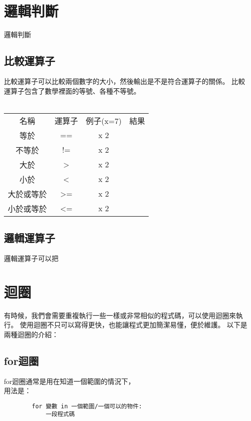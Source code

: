 \documentclass{article}
\begin{document}
\begin{large}
\section{邏輯判斷}

    邏輯判斷

    \subsection{比較運算子}

    比較運算子可以比較兩個數字的大小，然後輸出是不是符合運算子的關係。
    比較運算子包含了數學裡面的等號、各種不等號。\\
    \\
    \begin{tabular}{ |c|c|c|c| } 
        \hline
        名稱 & 運算子 & 例子(x=7) & 結果 \\
        等於 & == & x  2 &  \\
        不等於 & != & x  2 &  \\
        大於 & > & x  2 &  \\
        小於 & < & x  2 &  \\
        大於或等於 & >= & x  2 &  \\
        小於或等於 & <= & x  2 &  \\
        \hline
    \end{tabular}



    \subsection{邏輯運算子}

    邏輯運算子可以把

\section{迴圈}

    有時候，我們會需要重複執行一些一樣或非常相似的程式碼，可以使用迴圈來執行。
    使用迴圈不只可以寫得更快，也能讓程式更加簡潔易懂，便於維護。
    以下是兩種迴圈的介紹：

    \subsection{for迴圈}

    for迴圈通常是用在知道一個範圍的情況下，\\
    用法是：\\
    \begin{lstlisting}
        for 變數 in 一個範圍/一個可以的物件:
            一段程式碼
    \end{lstlisting}




\end{large}
\end{document}
